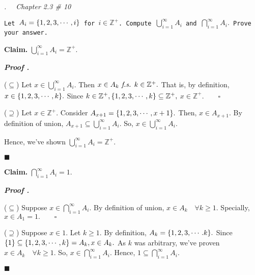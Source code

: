 \documentclass[11pt,letter]{article}
\newcounter{nq}[section]
\newcounter{np}[section]
\newenvironment*{p}{\par\noindent\textbf{\textit{Proof \stepcounter{np}\thenp. }}\par}{\par\hfill $\blacksquare$\par}
\newenvironment*{q}[1]{\noindent\emph{\thesection.\stepcounter{nq}\thenq$\quad $ #1}\par\noindent\texttt}{}
\newenvironment*{clm}{\par\noindent\textbf{Claim. }}{\par}
\def\Z{{\mathbb{Z}}}
\def\Zp{{\Z^+}}
\def\fs{\emph{ f.s. }}
\def\dsst{\displaystyle}
\begin{document}
\begin{framed}\begin{q}
	{Chapter 2.3 \# 10}
	{Let $A_i=\qty{1,2,3,\cdots,i}$ for $i\in\Zp$. Compute $\dsst\bigcup_{i=1}^\infty A_i$ and $\dsst\bigcap_{i=1}^\infty A_i.$ Prove your answer.}
\end{q}\end{framed}
\begin{clm}
	$\dsst\bigcup_{i=1}^\infty A_i=\Zp.$
\end{clm}
\begin{p}
	($\subseteq$) Let $x\in\dsst\bigcup_{i=1}^\infty A_i.$ Then $x\in A_k\fs k\in\Zp.$ That is, by definition, $x\in\qty{1,2,3,\cdots,k}.$ Since $k\in\Zp, \qty{1,2,3,\cdots,k}\subseteq\Zp,$ $x\in\Zp.\qquad\square$\par 
	($\supseteq$)	 Let $x\in\Zp.$ Consider $A_{x+1}=\qty{1,2,3,\cdots,x+1}.$ Then, $x\in A_{x+1}.$ By definition of union, $A_{x+1}\subseteq\dsst\bigcup_{i=1}^\infty A_i.$ So, $x\in\dsst\bigcup_{i=1}^\infty A_i.$\par 
	Hence, we've shown $\dsst\bigcup_{i=1}^\infty A_i=\Zp.$
\end{p}
\begin{clm}
	$\dsst\bigcap_{i=1}^\infty A_i=\qty{1}.$
\end{clm}
\begin{p}
	($\subseteq$) Suppose $x\in\dsst\bigcap_{i=1}^\infty A_i.$ By definition of union, $x\in A_k\quad\forall k\geq1.$ Specially, $x\in A_1=\qty{1}.\qquad\square$\par 
	($\supseteq$) Suppose $x\in\qty{1}.$ Let $k\geq1.$ By definition, $A_k=\qty{1,2,3,\cdots.k}.$ Since $\qty{1}\subseteq\qty{1,2,3,\cdots,k}=A_k, x\in A_k.$ As $k$ was arbitrary, we've proven $x\in A_k\quad\forall k\geq1.$ So, $x\in\dsst\bigcap_{i=1}^\infty A_i.$ Hence, $\qty{1}\subseteq\dsst\bigcap_{i=1}^\infty A_i.$
\end{p}
\end{document}
